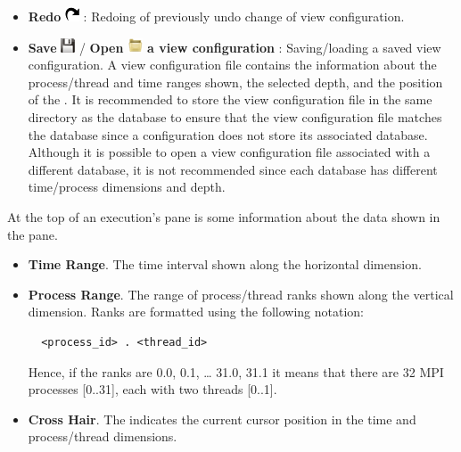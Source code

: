 \begin{itemize}
\item \textbf{Redo} \includegraphics[scale=.5]{fig/hpctraceviewer-button-redo.png} : Redoing of previously undo change of view configuration.
\item \textbf{Save} \includegraphics[scale=.5]{fig/hpctraceviewer-button-save.png}  / \textbf{Open \includegraphics[scale=.7]{fig/hpctraceviewer-button-open.png} a view configuration} : Saving/loading a saved view configuration. 
A view configuration file contains the information about the process/thread and time ranges shown, the selected depth, and the position of the \crosshair{}. 
It is recommended to store the view configuration file in the same directory as the database to ensure that the view configuration file matches the database since a configuration does not store its associated database. 
Although it is possible to open a view configuration file associated with a different database, it is not recommended since each database has different time/process dimensions and depth.


\end{itemize}

At the top of an execution's \traceview{} pane is some information about the data shown in the pane.
\begin{itemize}
 \item \textbf{Time Range}. The time interval shown along the horizontal dimension. 
 \item \textbf{Process Range}. The range of process/thread ranks shown along the vertical dimension. Ranks are formatted using the following notation:
\begin{verbatim}
  <process_id> . <thread_id>
\end{verbatim}
Hence, if the ranks are 0.0, 0.1, \dots{} 31.0, 31.1 it means that there are 32 MPI processes [0..31], each with two threads [0..1].

 \item \textbf{Cross Hair}. The \crosshair{} indicates the current cursor position in the time and process/thread dimensions. 
\end{itemize}

